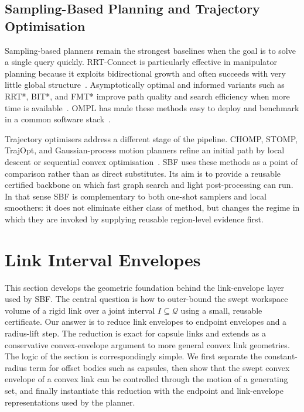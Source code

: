 \documentclass[journal]{IEEEtran}
\DeclareRobustCommand{\textsc}[1]{\textnormal{\MakeUppercase{#1}}}
\newcommand{\sbf}{\textsc{SBF}}
\newcommand{\Q}{\ensuremath{\mathcal{Q}}}
\begin{document}
\subsection{Sampling-Based Planning and Trajectory Optimisation}

Sampling-based planners remain the strongest baselines when the goal is to solve
a single query quickly. RRT-Connect is particularly effective in manipulator
planning because it exploits bidirectional growth and often succeeds with very
little global structure~\cite{kuffner2000rrt}. Asymptotically optimal and
informed variants such as RRT*, BIT*, and FMT* improve path quality and search
efficiency when more time is available~\cite{karaman2011sampling,
gammell2015batch,gammell2018informed,janson2015fmt}. OMPL has made these
methods easy to deploy and benchmark in a common software stack~\cite{sucan2012ompl,
moll2015benchmarking}.

Trajectory optimisers address a different stage of the pipeline. CHOMP, STOMP,
TrajOpt, and Gaussian-process motion planners refine an initial path by local
descent or sequential convex optimisation~\cite{ratliff2009chomp,
kalakrishnan2011stomp,schulman2014motion,mukadam2018gpmp2}. SBF uses these
methods as a point of comparison rather than as direct substitutes. Its aim is
to provide a reusable certified backbone on which fast graph search and light
post-processing can run. In that sense SBF is complementary to both one-shot
samplers and local smoothers: it does not eliminate either class of method, but
changes the regime in which they are invoked by supplying reusable region-level
evidence first.

\section{Link Interval Envelopes}\label{sec:link_envelopes}

This section develops the geometric foundation behind the link-envelope layer
used by \sbf{}. The central question is how to outer-bound the swept workspace
volume of a rigid link over a joint interval $I \subseteq \Q$ using a small,
reusable certificate. Our answer is to reduce link envelopes to endpoint
envelopes and a radius-lift step. The reduction is exact for capsule links and
extends as a conservative convex-envelope argument to more general convex link
geometries. The logic of the section is correspondingly simple. We first
separate the constant-radius term for offset bodies such as capsules, then show
that the swept convex envelope of a convex link can be controlled through the
motion of a generating set, and finally instantiate this reduction with the
endpoint and link-envelope representations used by the planner.
\end{document}

